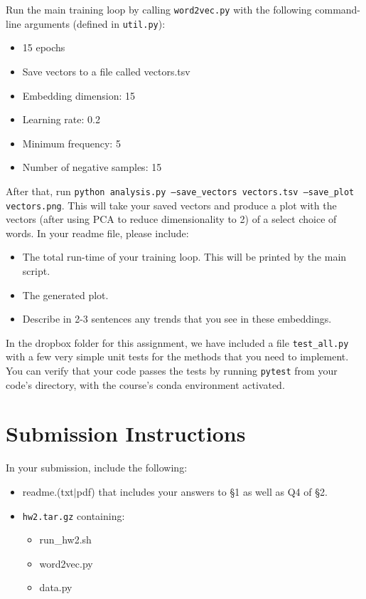 \documentclass[11pt]{article}
\begin{document}
\vspace{2em}
 Run the main training loop by calling \texttt{word2vec.py} with the following command-line arguments (defined in \texttt{util.py}):
\begin{itemize}
  \item 15 epochs
  \item Save vectors to a file called vectors.tsv
  \item Embedding dimension: 15
  \item Learning rate: 0.2
  \item Minimum frequency: 5
  \item Number of negative samples: 15
\end{itemize}
After that, run \texttt{python analysis.py --save\_vectors vectors.tsv --save\_plot vectors.png}.  This will take your saved vectors and produce a plot with the vectors (after using PCA to reduce dimensionality to 2) of a select choice of words.  In your readme file, please include: 
\begin{itemize}
  \item The total run-time of your training loop.  This will be printed by the main script.
  \item The generated plot.
  \item Describe in 2-3 sentences any trends that you see in these embeddings.
\end{itemize}


\vspace{2em}
 In the dropbox folder for this assignment, we have included a file \texttt{test\_all.py} with a few very simple unit tests for the methods that you need to implement.  You can verify that your code passes the tests by running \texttt{pytest} from your code's directory, with the course's conda environment activated.


\section*{Submission Instructions}

In your submission, include the following:
\begin{itemize}
  \item readme.(txt$\mid$pdf) that includes your answers to \S1 as well as Q4 of \S2. 
  \item \texttt{hw2.tar.gz} containing:
  \begin{itemize}
    \item run\_hw2.sh
    \item word2vec.py
    \item data.py
  \end{itemize}
\end{itemize}
\end{document}

